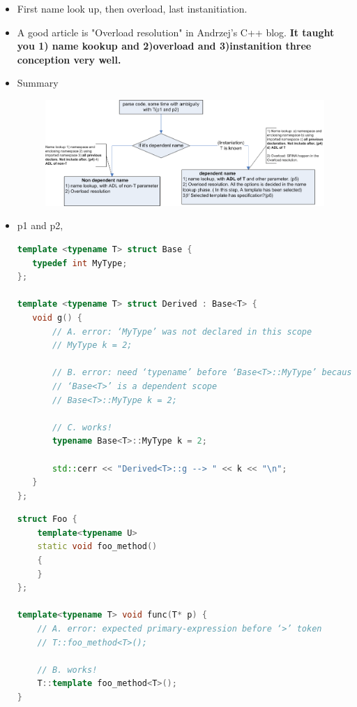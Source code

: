 \documentclass[a4paper,12pt,twoside]{book}
\begin{document}
\begin{itemize}
\item First name look up, then overload, last instanitiation.

\item A good article is "Overload resolution" in Andrzej's C++ blog. \textbf{It taught you 1) name kookup and 2)overload and 3)instanition three conception very well.}

\item Summary 
\begin{figure}
	\centering
	\includegraphics[scale=0.8]{pics/template.png}
\end{figure}


\item p1 and p2, 
\begin{lstlisting}[frame=single, language=c++]
template <typename T> struct Base {
   typedef int MyType;
};

template <typename T> struct Derived : Base<T> {
   void g() {
       // A. error: ‘MyType’ was not declared in this scope
       // MyType k = 2;

       // B. error: need ‘typename’ before ‘Base<T>::MyType’ because
       // ‘Base<T>’ is a dependent scope
       // Base<T>::MyType k = 2;

       // C. works!
       typename Base<T>::MyType k = 2;

       std::cerr << "Derived<T>::g --> " << k << "\n";
   }
};
\end{lstlisting}

\begin{lstlisting}[frame=single, language=c++]
struct Foo {
    template<typename U>
    static void foo_method()
    {
    }
};

template<typename T> void func(T* p) {
    // A. error: expected primary-expression before ‘>’ token
    // T::foo_method<T>();

    // B. works!
    T::template foo_method<T>();
}
\end{lstlisting}




\end{itemize}
\end{document}
